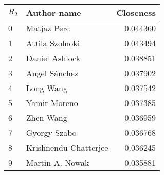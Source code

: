 \begin{tabular}{llr}
\toprule
\(R_2\) &            Author name &  Closeness \\
\midrule
0 &            Matjaz Perc &   0.044360 \\
1 &        Attila Szolnoki &   0.043494 \\
2 &         Daniel Ashlock &   0.038851 \\
3 &          Angel Sánchez &   0.037902 \\
4 &              Long Wang &   0.037542 \\
5 &           Yamir Moreno &   0.037385 \\
6 &              Zhen Wang &   0.036959 \\
7 &           Gyorgy Szabo &   0.036768 \\
8 &  Krishnendu Chatterjee &   0.036245 \\
9 &        Martin A. Nowak &   0.035881 \\
\bottomrule
\end{tabular}
